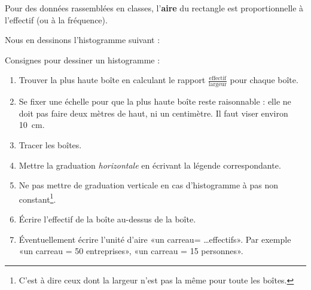 \begin{Aretenir}
Pour des données rassemblées en classes, l'\textbf{aire} du rectangle est proportionnelle à l'effectif (ou à la fréquence). 
\end{Aretenir}

Nous en dessinons l'histogramme suivant :
\begin{center}
   
\end{center}


Consignes pour dessiner un histogramme :
\begin{enumerate}
    \item
        Trouver la plus haute boîte en calculant le rapport \( \frac{ \text{effectif} }{ \text{largeur} }\) pour chaque boîte.
    \item
        Se fixer une échelle pour que la plus haute boîte reste raisonnable : elle ne doit pas faire deux mètres de haut, ni un centimètre. Il faut viser environ \SI{10}{\centi\meter}.
    \item
        Tracer les boîtes.
    \item
        Mettre la graduation \emph{horizontale} en écrivant la légende correspondante.
    \item
        Ne pas mettre de graduation verticale en cas d'histogramme à pas non constant\footnote{C'est à dire ceux dont la largeur n'est pas la même pour toute les boîtes.}.
    \item
        Écrire l'effectif de la boîte au-dessus de la boîte.
    \item
        Éventuellement écrire l'unité d'aire «un carreau= \ldots effectifs». Par exemple «un carreau = 50 entreprises», «un carreau = 15 personnes».
\end{enumerate}



